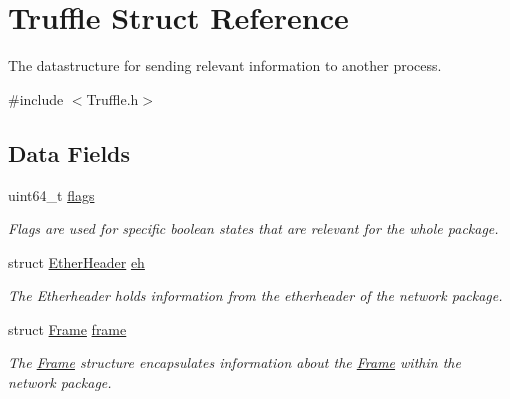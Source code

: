 \hypertarget{struct_truffle}{\section{Truffle Struct Reference}
\label{struct_truffle}
}


The datastructure for sending relevant information to another process.  




{\ttfamily \#include $<$Truffle.\-h$>$}

\subsection*{Data Fields}
\begin{DoxyCompactItemize}
\item 
\hypertarget{struct_truffle_a1bc395d944619d99db720a9cd304b279}{uint64\-\_\-t \hyperlink{struct_truffle_a1bc395d944619d99db720a9cd304b279}{flags}}\label{struct_truffle_a1bc395d944619d99db720a9cd304b279}

\begin{DoxyCompactList}\small\item\em Flags are used for specific boolean states that are relevant for the whole package. \end{DoxyCompactList}\item 
\hypertarget{struct_truffle_a8f9ef6e469d9eb375f3e4bf0155c6da2}{struct \hyperlink{struct_ether_header}{Ether\-Header} \hyperlink{struct_truffle_a8f9ef6e469d9eb375f3e4bf0155c6da2}{eh}}\label{struct_truffle_a8f9ef6e469d9eb375f3e4bf0155c6da2}

\begin{DoxyCompactList}\small\item\em The Etherheader holds information from the etherheader of the network package. \end{DoxyCompactList}\item 
\hypertarget{struct_truffle_aa69a97f8982cbbcab85c0d391d0eec0d}{struct \hyperlink{struct_frame}{Frame} \hyperlink{struct_truffle_aa69a97f8982cbbcab85c0d391d0eec0d}{frame}}\label{struct_truffle_aa69a97f8982cbbcab85c0d391d0eec0d}

\begin{DoxyCompactList}\small\item\em The \hyperlink{struct_frame}{Frame} structure encapsulates information about the \hyperlink{struct_frame}{Frame} within the network package. \end{DoxyCompactList}\end{DoxyCompactItemize}


